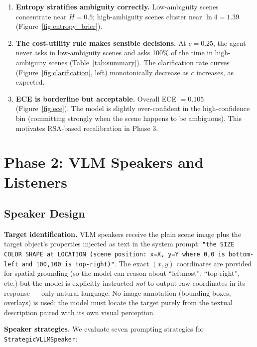 \documentclass[11pt]{article}
\begin{document}
\begin{enumerate}
    \item \textbf{Entropy stratifies ambiguity correctly.}
    Low-ambiguity scenes concentrate near $H = 0.5$; high-ambiguity scenes cluster
    near $\ln 4 = 1.39$ (Figure~\ref{fig:entropy_brier}).

    \item \textbf{The cost-utility rule makes sensible decisions.}
    At $c = 0.25$, the agent never asks in low-ambiguity scenes and asks 100\% of the
    time in high-ambiguity scenes (Table~\ref{tab:summary}).  The clarification rate
    curves (Figure~\ref{fig:clarification}, left) monotonically decrease as $c$
    increases, as expected.

    \item \textbf{ECE is borderline but acceptable.}
    Overall ECE $= 0.105$ (Figure~\ref{fig:ece}).  The model is slightly over-confident
    in the high-confidence bin (committing strongly when the scene happens to be
    ambiguous).  This motivates RSA-based recalibration in Phase 3.
\end{enumerate}

\section{Phase 2: VLM Speakers and Listeners}

\subsection{Speaker Design}

\textbf{Target identification.}
VLM speakers receive the plain scene image plus the target object's properties
injected as text in the system prompt:
\texttt{"the SIZE COLOR SHAPE at LOCATION (scene position: x=X, y=Y where 0,0
is bottom-left and 100,100 is top-right)"}.
The exact $(x,y)$ coordinates are provided for spatial grounding (so the model
can reason about ``leftmost'', ``top-right'', etc.) but the model is explicitly
instructed \emph{not} to output raw coordinates in its response --- only natural language.
No image annotation (bounding boxes, overlays) is used; the model must locate
the target purely from the textual description paired with its own visual perception.

\textbf{Speaker strategies.}
We evaluate seven prompting strategies for \texttt{StrategicVLLMSpeaker}:
\end{document}
